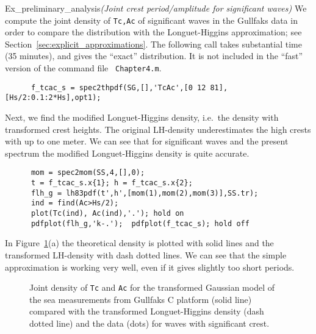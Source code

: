 \begin{cex}{Ex_preliminary_analysis}{\sl (Joint crest period/amplitude for significant waves)} 
 We compute the joint density of
\verb+Tc,Ac+ of significant waves in the Gullfaks data in order to
compare the distribution with the Longuet-Higgins approximation; see
Section~\ref{sec:explicit_approximations}. The following call takes
substantial time (35 minutes), and gives the ``exact'' distribution.
It is not included in the ``fast'' version of the command file {\tt
  Chapter4.m}. 
{\small\begin{verbatim}
      f_tcac_s = spec2thpdf(SG,[],'TcAc',[0 12 81],[Hs/2:0.1:2*Hs],opt1);
\end{verbatim}
}

Next, we find the modified Longuet-Higgins density, i.e.\
the density with transformed crest heights.
The original LH-density underestimates the high crests
with up to one meter.  We can see that for significant waves and
the present spectrum the modified Longuet-Higgins density is quite accurate.
{\small\begin{verbatim}
      mom = spec2mom(SS,4,[],0);
      t = f_tcac_s.x{1}; h = f_tcac_s.x{2};
      flh_g = lh83pdf(t',h',[mom(1),mom(2),mom(3)],SS.tr);
      ind = find(Ac>Hs/2);
      plot(Tc(ind), Ac(ind),'.'); hold on
      pdfplot(flh_g,'k-.');  pdfplot(f_tcac_s); hold off
\end{verbatim}
} 

\noindent
In Figure~\ref{fig77}(a) the theoretical density is plotted with solid
lines and the transformed LH-density with dash dotted lines.
We can see that the simple approximation is working very well,
even if it gives slightly too short periods.
\begin{figure}[tbh]
\hfill
{}
\vspace{-3mm}
\caption[Joint density of {\tt Tc} and {\tt Ac}
compared with Longuet-Higgins density]{
Joint density of {\tt Tc} and {\tt Ac} for the transformed
Gaussian model of the sea measurements from Gullfaks C platform (solid
line) compared with the transformed Longuet-Higgins density (dash
dotted line) and the data (dots) for waves with significant crest.
}
  \label{fig77}
\end{figure}


\end{cex}
